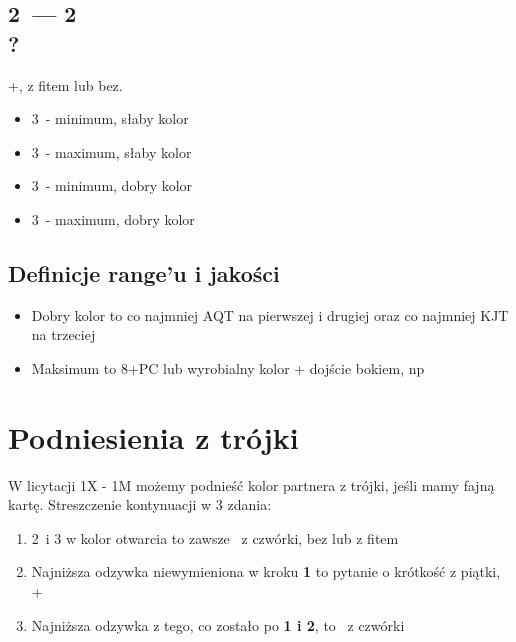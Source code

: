 \documentclass[12pt, a4paper]{article}
\begin{document}
\subsection{2\diams\ --- 2\ntx \\ ?}
\inv+, z fitem lub bez.
\begin{itemize}
    \item 3\clubs\ - minimum, słaby kolor
    \item 3\diams\ - maximum, słaby kolor
    \item 3\hearts\ - minimum, dobry kolor
    \item 3\spades\ - maximum, dobry kolor
\end{itemize}

\subsection{Definicje range'u i jakości}
\begin{itemize}
    \item Dobry kolor to co najmniej AQT na pierwszej i drugiej oraz co najmniej KJT na trzeciej
    \item Maksimum to 8+PC lub wyrobialny kolor + dojście bokiem, np \\ 
\end{itemize}


\pagebreak
\section{Podniesienia z trójki}
W licytacji 1X - 1M możemy podnieść kolor partnera z trójki, jeśli mamy fajną kartę.
Streszczenie kontynuacji w 3 zdania:
\begin{enumerate}[label=\textbf{\arabic*.}]
    \item 2\nt\ i 3 w kolor otwarcia to zawsze \inv\ z czwórki, bez lub z fitem \minor\ 
    \item Najniższa odzywka niewymieniona w kroku \textbf{1} to pytanie o krótkość z piątki, \inv+
    \item Najniższa odzywka z tego, co zostało po \textbf{1 i 2}, to \gf\ z czwórki
\end{enumerate}
\end{document}
